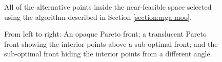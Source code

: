 \begin{figure}[h]
  \centering
  \resizebox{0.6\columnwidth}{!}{}
  \caption{All of the alternative points inside the near-feasible space selected using the algorithm described in Section \ref{section:mga-moo}.}
  \label{fig:nd-mga}
\end{figure}

\begin{figure}[H]
  \centering
  \resizebox{1\columnwidth}{!}{}
  \caption{From left to right: An opaque Pareto front; a translucent Pareto front showing the interior points above a sub-optimal front; and the sub-optimal front hiding the interior points from a different angle.}
  \label{fig:3d-mga}
\end{figure}